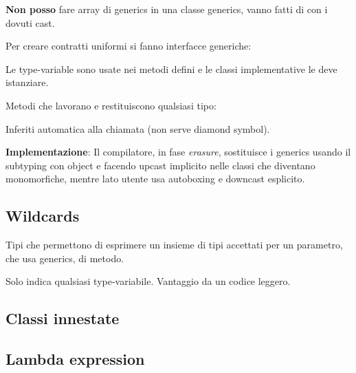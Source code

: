 \textbf{Non posso} fare array di generics in una classe generics, vanno fatti di  con i dovuti cast.

\bigskip

Per creare contratti uniformi si fanno interfacce generiche:


Le type-variable sono usate nei metodi defini e le classi implementative le deve istanziare.

\bigskip

Metodi che lavorano e restituiscono qualsiasi tipo:



Inferiti automatica alla chiamata (non serve diamond symbol).

\bigskip

\textbf{Implementazione}: Il compilatore, in fase \textit{erasure}, sostituisce i generics usando il subtyping con object e facendo upcast implicito nelle classi che diventano monomorfiche, mentre lato utente usa autoboxing e downcast esplicito.

\subsection{Wildcards}
Tipi che permettono di esprimere un insieme di tipi accettati per un parametro, che usa generics, di metodo.


Solo  indica qualsiasi type-variabile. Vantaggio da un codice leggero.

\subsection{Classi innestate}

\subsection{Lambda expression}
